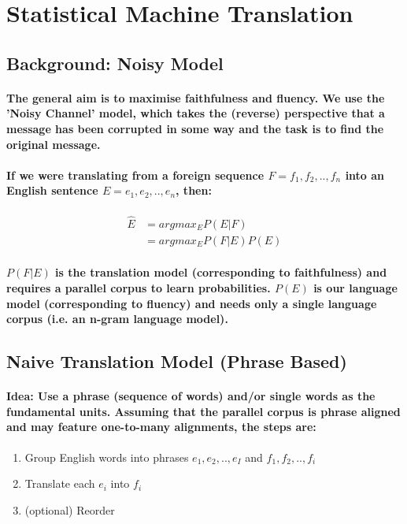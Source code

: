 \documentclass[]{article}
\begin{document}
\section{Statistical Machine Translation}
\subsection{Background: Noisy Model}
\paragraph{The general aim is to maximise faithfulness and fluency. We use the 'Noisy Channel' model, which takes the (reverse) perspective that a message has been corrupted in some way and the task is to find the original message.}

\paragraph{If we were translating from a foreign sequence $F=f_1, f_2, .., f_n$ into an English sentence $E=e_1, e_2, .., e_n$, then:}

\begin{align}
	\hat E &= argmax_E P(E|F) \\
	&= argmax_E P(F|E)P(E)
\end{align}

\paragraph{$P(F|E)$ is the translation model (corresponding to faithfulness) and requires a parallel corpus to learn probabilities. $P(E)$ is our language model (corresponding to fluency) and needs only a single language corpus (i.e. an n-gram language model).}



\subsection{Naive Translation Model (Phrase Based)}
\paragraph{Idea: Use a phrase (sequence of words) and/or single words as the fundamental units. Assuming that the parallel corpus is phrase aligned and may feature one-to-many alignments, the steps are:} 
	
\begin{enumerate}
	\item Group English words into phrases $e_1, e_2, .., e_I$ and $f_1, f_2, .., f_i$ 
	\item Translate each $e_i$ into $f_i$
	\item (optional) Reorder
\end{enumerate}
\end{document}
